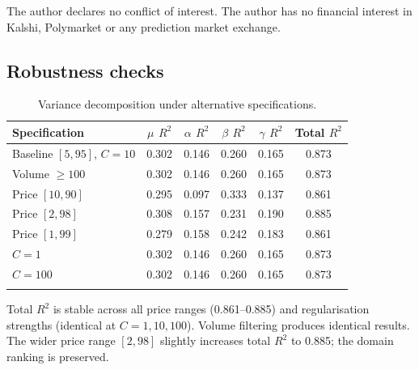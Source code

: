 \documentclass[numsec,webpdf,modern,medium]{oup-authoring-template}
\theoremstyle{thmstyleone}%
\theoremstyle{thmstyletwo}%
\theoremstyle{thmstylethree}%
\begin{document}
The author declares no conflict of interest. The author has no financial interest in Kalshi, Polymarket or any prediction market exchange.


\begin{appendices}

\section{Robustness checks}\label{app:robustness}

\begin{table}[!t]
\caption{Variance decomposition under alternative specifications.\label{tab:robust}}%
\begin{tabular*}{\columnwidth}{@{\extracolsep\fill}lccccc@{\extracolsep\fill}}
\toprule
Specification & $\mu$ $R^2$ & $\alpha$ $R^2$ & $\beta$ $R^2$ & $\gamma$ $R^2$ & Total $R^2$ \\
\midrule
Baseline $[5,95]$, $C=10$ & 0.302 & 0.146 & 0.260 & 0.165 & 0.873 \\
Volume $\geq 100$         & 0.302 & 0.146 & 0.260 & 0.165 & 0.873 \\
Price $[10,90]$           & 0.295 & 0.097 & 0.333 & 0.137 & 0.861 \\
Price $[2,98]$            & 0.308 & 0.157 & 0.231 & 0.190 & 0.885 \\
Price $[1,99]$            & 0.279 & 0.158 & 0.242 & 0.183 & 0.861 \\
$C = 1$                   & 0.302 & 0.146 & 0.260 & 0.165 & 0.873 \\
$C = 100$                 & 0.302 & 0.146 & 0.260 & 0.165 & 0.873 \\
\botrule
\end{tabular*}
\begin{tablenotes}%
\item Total $R^2$ is stable across all price ranges (0.861--0.885) and regularisation strengths (identical at $C = 1, 10, 100$). Volume filtering produces identical results. The wider price range $[2, 98]$ slightly increases total $R^2$ to 0.885; the domain ranking is preserved.
\end{tablenotes}
\end{table}


\end{appendices}
\end{document}
